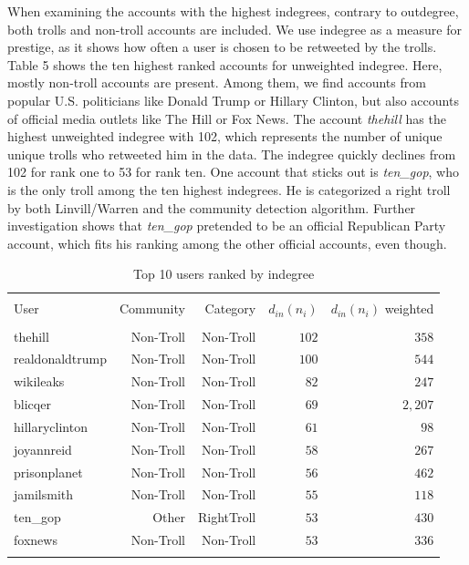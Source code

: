 \documentclass[12pt, titlepage=true, toc=bib]{scrartcl}
\begin{document}
When examining the accounts with the highest indegrees, contrary to outdegree, both trolls and non-troll accounts are included. We use indegree as a measure for prestige, as it shows how often a user is chosen to be retweeted by the trolls. Table 5 shows the ten highest ranked accounts for unweighted indegree. Here, mostly non-troll accounts are present. Among them, we find  accounts from popular U.S. politicians like Donald Trump or Hillary Clinton, but also accounts of official media outlets like The Hill or Fox News. The account \textit{thehill} has the highest unweighted indegree with 102, which represents the number of unique unique trolls who retweeted him in the data. The indegree quickly declines from 102 for rank one to 53 for rank ten. One account that sticks out is \textit{ten\_gop}, who is the only troll among the ten highest indegrees. He is categorized a right troll by both Linvill/Warren \cite*{linvill_troll_2018} and the community detection algorithm. Further investigation shows that \textit{ten\_gop} pretended to be an official Republican Party account, which fits his ranking among the other official accounts, even though. %

\begin{table}[ht] \centering 
  \begin{tabular*}{.95\linewidth}{@{\extracolsep{\fill}} lrrrr} 
\\[-1.8ex]\hline 
\hline \\[-1.8ex] 
User & Community & Category & \( d_{in}(n_{i}) \) & \( d_{in}(n_{i}) \) weighted \\ 
\hline \\[-1.8ex] 
thehill & Non-Troll & Non-Troll & $102$ & $358$ \\ 
realdonaldtrump & Non-Troll & Non-Troll & $100$ & $544$ \\ 
wikileaks & Non-Troll & Non-Troll & $82$ & $247$ \\ 
blicqer & Non-Troll & Non-Troll & $69$ & $2,207$ \\ 
hillaryclinton & Non-Troll & Non-Troll & $61$ & $98$ \\ 
joyannreid & Non-Troll & Non-Troll & $58$ & $267$ \\ 
prisonplanet & Non-Troll & Non-Troll & $56$ & $462$ \\ 
jamilsmith & Non-Troll & Non-Troll & $55$ & $118$ \\ 
ten\_gop & Other & RightTroll & $53$ & $430$ \\ 
foxnews & Non-Troll & Non-Troll & $53$ & $336$ \\ 
\hline \\[-1.8ex] 
\end{tabular*} 
\caption{Top 10 users ranked by indegree} 
  \label{tab:in} 
\end{table} 
\end{document}
